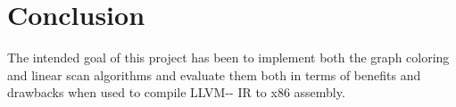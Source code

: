 \documentclass{article}
\begin{document}
\section{Conclusion}

The intended goal of this project has been to implement both the graph coloring and linear scan algorithms and evaluate them both in terms of benefits and drawbacks when used to compile LLVM-{}- IR to x86 assembly.





\printbibliography 


\appendix

\newpage

\end{document}
